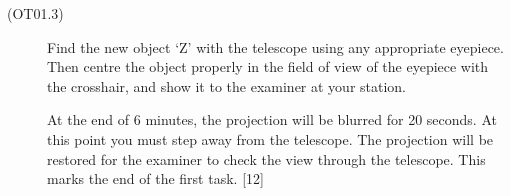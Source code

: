 \begin{description}
\item[(OT01.3)] Find the new object `Z' with the telescope using any
  appropriate eyepiece. Then centre the object properly in the field of view
  of the eyepiece with the crosshair, and show it to the examiner at your
  station.

  At the end of 6 minutes, the projection will be blurred for 20 seconds. At
  this point you must step away from the telescope. The projection will be
  restored for the examiner to check the view through the telescope. This
  marks the end of the first task. \hfill[12]
\end{description}
